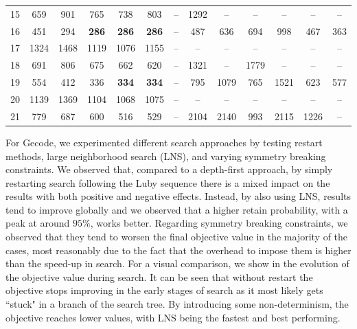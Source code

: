 \begin{table}[H]
{\begin{tabular}{c|cccccccccccc}
            15 & 659            & 901           & 765           & 738           & 803           & --            & 1292          & --            & --            & --            & --            & --            \\ 
            16 & 451            & 294           & \textbf{286}  & \textbf{286}  & \textbf{286}  & --            & 487           & 636           & 694           & 998           & 467           & 363           \\ 
            17 & 1324           & 1468          & 1119          & 1076          & 1155          & --            & --            & --            & --            & --            & --            & --            \\ 
            18 & 691            & 806           & 675           & 662           & 620           & --            & 1321          & --            & 1779          & --            & --            & --            \\ 
            19 & 554            & 412           & 336           & \textbf{334}  & \textbf{334}  & --            & 795           & 1079          & 765           & 1521          & 623           & 577           \\ 
            20 & 1139           & 1369          & 1104          & 1068          & 1075          & --            & --            & --            & --            & --            & --            & --            \\ 
            21 & 779            & 687           & 600           & 516           & 529           & --            & 2104          & 2140          & 993           & 2115          & 1226          & --            \\ 
            \bottomrule
        \end{tabular}
    }
\end{table}

For Gecode, we experimented different search approaches by testing restart methods, large neighborhood search (LNS), and varying symmetry breaking constraints. We observed that, compared to a depth-first approach, by simply restarting search following the Luby sequence there is a mixed impact on the results with both positive and negative effects. Instead, by also using LNS, results tend to improve globally and we observed that a higher retain probability, with a peak at around $95\%$, works better. Regarding symmetry breaking constraints, we observed that they tend to worsen the final objective value in the majority of the cases, most reasonably due to the fact that the overhead to impose them is higher than the speed-up in search. For a visual comparison, we show in  the evolution of the objective value during search. It can be seen that without restart the objective stops improving in the early stages of search as it most likely gets ``stuck" in a branch of the search tree. By introducing some non-determinism, the objective reaches lower values, with LNS being the fastest and best performing.

